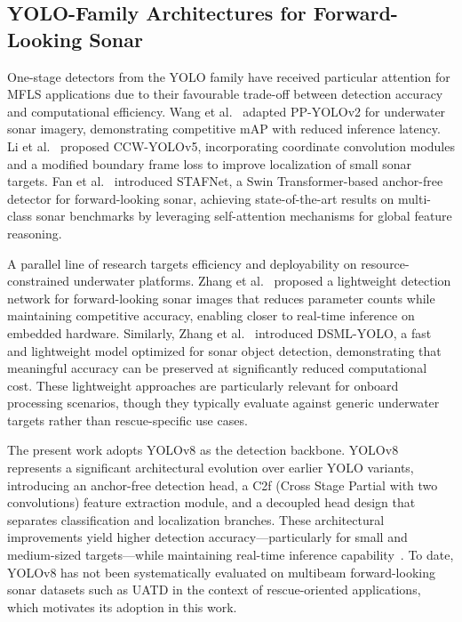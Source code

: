 \documentclass[conference]{IEEEtran}
\begin{document}
\subsection{YOLO-Family Architectures for Forward-Looking Sonar}

One-stage detectors from the YOLO family have received particular attention for MFLS applications due to their favourable trade-off between detection accuracy and computational efficiency. Wang et al.~\cite{ref14} adapted PP-YOLOv2 for underwater sonar imagery, demonstrating competitive mAP with reduced inference latency. Li et al.~\cite{ref15} proposed CCW-YOLOv5, incorporating coordinate convolution modules and a modified boundary frame loss to improve localization of small sonar targets. Fan et al.~\cite{ref16} introduced STAFNet, a Swin Transformer-based anchor-free detector for forward-looking sonar, achieving state-of-the-art results on multi-class sonar benchmarks by leveraging self-attention mechanisms for global feature reasoning.

A parallel line of research targets efficiency and deployability on resource-constrained underwater platforms. Zhang et al.~\cite{ref17} proposed a lightweight detection network for forward-looking sonar images that reduces parameter counts while maintaining competitive accuracy, enabling closer to real-time inference on embedded hardware. Similarly, Zhang et al.~\cite{ref18} introduced DSML-YOLO, a fast and lightweight model optimized for sonar object detection, demonstrating that meaningful accuracy can be preserved at significantly reduced computational cost. These lightweight approaches are particularly relevant for onboard processing scenarios, though they typically evaluate against generic underwater targets rather than rescue-specific use cases.

The present work adopts YOLOv8 as the detection backbone. YOLOv8 represents a significant architectural evolution over earlier YOLO variants, introducing an anchor-free detection head, a C2f (Cross Stage Partial with two convolutions) feature extraction module, and a decoupled head design that separates classification and localization branches. These architectural improvements yield higher detection accuracy---particularly for small and medium-sized targets---while maintaining real-time inference capability~\cite{ref8}. To date, YOLOv8 has not been systematically evaluated on multibeam forward-looking sonar datasets such as UATD in the context of rescue-oriented applications, which motivates its adoption in this work.
\end{document}
